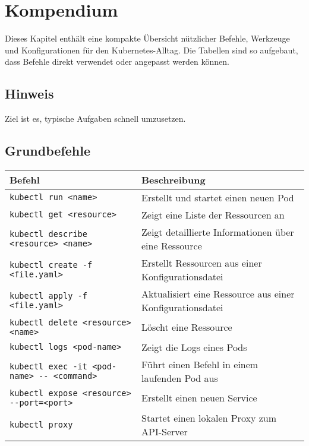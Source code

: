 \chapter{Kompendium}
\label{chap:kompendium}

Dieses Kapitel enthält eine kompakte Übersicht nützlicher Befehle, Werkzeuge und Konfigurationen für den Kubernetes-Alltag.  
Die Tabellen sind so aufgebaut, dass Befehle direkt verwendet oder angepasst werden können.

\section*{Hinweis}
Ziel ist es, typische Aufgaben schnell umzusetzen.

\section{Grundbefehle}
\begin{tabular}{|p{}|p{}|}
\hline
\textbf{Befehl} & \textbf{Beschreibung} \\
\hline
\texttt{kubectl run <name>} & Erstellt und startet einen neuen Pod \\
\texttt{kubectl get <resource>} & Zeigt eine Liste der Ressourcen an \\
\texttt{kubectl describe <resource> <name>} & Zeigt detaillierte Informationen über eine Ressource \\
\texttt{kubectl create -f <file.yaml>} & Erstellt Ressourcen aus einer Konfigurationsdatei \\
\texttt{kubectl apply -f <file.yaml>} & Aktualisiert eine Ressource aus einer Konfigurationsdatei \\
\texttt{kubectl delete <resource> <name>} & Löscht eine Ressource \\
\texttt{kubectl logs <pod-name>} & Zeigt die Logs eines Pods \\
\texttt{kubectl exec -it <pod-name> {-}{-} <command>} & Führt einen Befehl in einem laufenden Pod aus \\
\texttt{kubectl expose <resource> {-}{-}port=<port>} & Erstellt einen neuen Service \\
\texttt{kubectl proxy} & Startet einen lokalen Proxy zum API-Server \\
\hline
\end{tabular}

